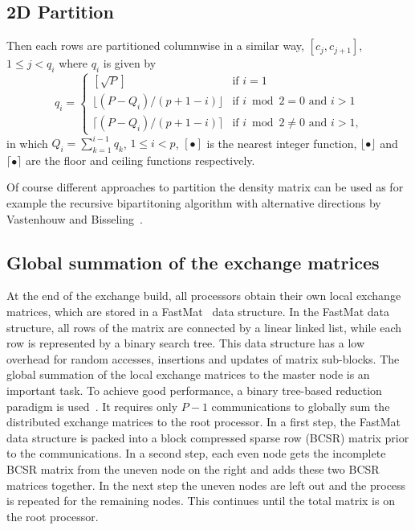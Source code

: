 \documentclass[prl,twocolumn,showpacs,twocolumngrid,superbib]{revtex4}
\begin{document}
\subsection{2D Partition}
 Then each rows are partitioned columnwise in a similar way,
 $[c_j,c_{j+1}]$, $1 \le j < q_i$ where $q_i$ is given
 by 
\begin{equation}
  q_i = \left\{ \begin{array}{ll}
    [\sqrt{P}]                    & \textrm{if $i=1$}\\
    \lfloor(P-Q_i)/(p+1-i)\rfloor & \textrm{if $i\bmod2=0$ and $i>1$}\\
    \lceil (P-Q_i)/(p+1-i)\rceil  & \textrm{if $i\bmod2\ne0$ and $i>1$,}
    \end{array} \right.
\end{equation}
 in which $Q_i=\sum_{k=1}^{i-1}q_k$, $1 \le i < p$, $[\bullet]$ 
 is the nearest integer function, $\lfloor\bullet\rfloor$ and $\lceil\bullet\rceil$
 are the floor and ceiling functions respectively.
 
 Of course different approaches to partition the density matrix can be 
 used as for example the recursive bipartitoning algorithm with
 alternative directions by Vastenhouw and Bisseling~\cite{BVastenhouw}.

\subsection{Global summation of the exchange matrices}
 At the end of the exchange build, all processors obtain their own local
 exchange matrices, which are stored in a FastMat~\cite{CGan04B} data
 structure. In the FastMat data structure, all rows of the matrix 
 are connected by a linear linked list, while each row is represented
 by a binary search tree. This data structure has a low overhead for random
 accesses, insertions and updates of matrix sub-blocks.
 The global summation of the local exchange matrices to the master node is
 an important task. To achieve good performance, a binary tree-based 
 reduction paradigm is used~\cite{GFox88,RGeijn91}. It requires 
 only $P-1$ communications to globally
 sum the distributed exchange matrices to the root processor.
 In a first step, the FastMat data structure is packed into a 
 block compressed sparse row (BCSR) matrix
 prior to the communications. In a second step,
 each even node gets the incomplete BCSR matrix from the 
 uneven node on the right and adds these two BCSR matrices together. 
 In the next step the uneven nodes are left out and the process 
 is repeated for the remaining nodes. This continues until the total 
 matrix is on the root processor. 
\end{document}
